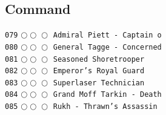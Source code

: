 \documentclass[a4paper,landscape]{article}
\begin{document}
\begin{multicols*}{5}
\section{Command} 
\vspace{-2mm} 
\texttt{079} \(\bigcirc\!\bigcirc\!\bigcirc\)  \texttt{Admiral Piett - Captain o} \vspace{-0.3mm}\\ 
\texttt{080} \(\bigcirc\!\bigcirc\!\bigcirc\)  \texttt{General Tagge - Concerned} \vspace{-0.3mm}\\ 
\texttt{081} \(\bigcirc\!\bigcirc\!\bigcirc\)  \texttt{Seasoned Shoretrooper} \vspace{-0.3mm}\\ 
\texttt{082} \(\bigcirc\!\bigcirc\!\bigcirc\)  \texttt{Emperor's Royal Guard} \vspace{-0.3mm}\\ 
\texttt{083} \(\bigcirc\!\bigcirc\!\bigcirc\)  \texttt{Superlaser Technician} \vspace{-0.3mm}\\ 
\texttt{084} \(\bigcirc\!\bigcirc\!\bigcirc\)  \texttt{Grand Moff Tarkin - Death} \vspace{-0.3mm}\\ 
\texttt{085} \(\bigcirc\!\bigcirc\!\bigcirc\)  \texttt{Rukh - Thrawn's Assassin} \vspace{-0.3mm}\\ 

\end{multicols*}
\end{document}
